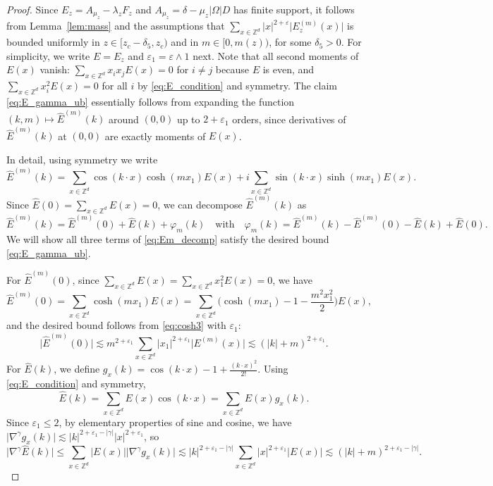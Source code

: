 \documentclass[11pt,hidelinks]{article}
\theoremstyle{plain}
\numberwithin{equation}{section}
\newcommand{\eps}{\varepsilon}
\newcommand{\Z}{\mathbb{Z}}
\newcommand{\grad}{\nabla}
\renewcommand{\(}{\left(}
\renewcommand{\)}{\right)}
\newcommand{\1}{\mathds{1}}
\providecommand{\abs}[1]{\lvert#1\rvert}
\newcommand{\mz}{m(z)}
\newcommand{\muz}{{\mu_z}}
\newcommand{\supm}{^{(m)}}
\begin{document}
\begin{proof}
Since $E_z = A_\muz - \lambda_z F_z$
and $A_\muz = \delta - \muz\abs\Omega D$ has finite support, 
it follows from Lemma~\ref{lem:mass} and the assumptions that $\sum_{x\in \Z^d} \abs x^{2+\eps} \abs{ E_z\supm(x)}$ is bounded uniformly in $z \in [ z_c - \delta_5, z_c )$ and in $m \in [0, \mz)$, for some $\delta_5>0$. 
For simplicity, we write $E = E_z$ and $\eps_1 = \eps \wedge 1$ next. 
Note that all second moments of $E(x)$ vanish: 
$\sum_{x\in \Z^d} x_i x_j E(x) = 0$ for $i\ne j$ because $E$ is even, and $\sum_{x\in \Z^d} x_i^2 E(x) = 0$ for all $i$ by \eqref{eq:E_condition} and symmetry.
The claim \eqref{eq:E_gamma_ub} essentially follows from expanding the function $(k,m)\mapsto \hat E\supm(k)$ around $(0,0)$ up to $2+\eps_1$ orders, since derivatives of $\hat E\supm (k)$ at $(0,0)$ are exactly moments of $E(x)$.

In detail, using symmetry we write
\begin{equation}
\hat E\supm(k) = 
	\sum_{x\in \Z^d} \cos (k\cdot x) \cosh (mx_1) E(x) 
	+ i \sum_{x\in \Z^d} \sin (k\cdot x) \sinh (mx_1) E(x). 
\end{equation}
Since $\hat E(0) = \sum_{x\in \Z^d} E(x) = 0$, we can decompose $\hat E\supm(k)$ as 
\begin{equation}
\label{eq:Em_decomp}
\hat E\supm(k)
	= \hat E\supm(0) + \hat E(k) + \varphi_m(k)
	\quad \text{with}\quad
	\varphi_m(k) = \hat E\supm(k) - \hat E\supm(0) - \hat E(k) + \hat E(0) .
\end{equation}
We will show all three terms of \eqref{eq:Em_decomp} satisfy the desired bound \eqref{eq:E_gamma_ub}. 

For $\hat E\supm(0)$, since $\sum_{x\in \Z^d} E(x) = \sum_{x\in \Z^d} x_1^2 E(x) = 0$, we have
\begin{equation}
\hat E\supm(0) = \sum_{x\in \Z^d} \cosh(mx_1) E(x)
	= \sum_{x\in \Z^d} \Big( \cosh(mx_1) - 1 - \frac{ m^2 x_1^2 } 2 \Big) E(x),
\end{equation}
and the desired bound follows from \eqref{eq:cosh3} with $\eps_1$:
\begin{equation}
\abs{ \hat E\supm(0) } \lesssim m^{2+\eps_1} \sum_{x\in \Z^d}  \abs {x_1}^{2+\eps_1} \abs{ E\supm(x) }
	\lesssim (\abs k + m)^{2+\eps_1}. 
\end{equation}
For $\hat E(k)$, we define $g_x(k) = \cos(k\cdot x) - 1 + \frac{ (k\cdot x)^2 }{2!}$.
Using \eqref{eq:E_condition} and symmetry, 
\begin{equation}
\hat E(k) = \sum_{x\in \Z^d} E(x) \cos(k\cdot x) = \sum_{x\in \Z^d} E(x) g_x(k).
\end{equation}
Since $\eps_1 \le 2$, by elementary properties of sine and cosine, we have
$\abs{ \grad^\gamma g_x(k) } 
\lesssim \abs k^{2+\eps_1 - \abs \gamma} \abs x^{2+\eps_1}$, so
\begin{equation}
\abs{ \grad^\gamma \hat E (k) }
\le \sum_{x\in \Z^d} \abs {E(x)} \abs{ \grad^\gamma g_x(k) }
\lesssim \abs k^{2+\eps_1 - \abs \gamma} \sum_{x\in \Z^d} \abs x^{2+\eps_1} \abs{ E(x) }
\lesssim ( \abs k + m )^{2 + \eps_1 - \abs \gamma}. 
\end{equation}


\end{proof}
\end{document}

